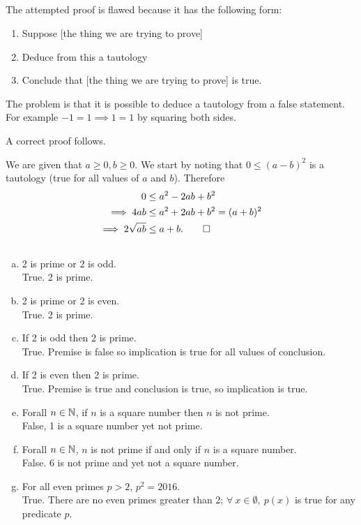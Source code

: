\documentclass[12pt]{article}
\begin{document}
\subsection{}
\begin{mdframed}
  The attempted proof is flawed because it has the following form:
  \begin{enumerate}
  \item Suppose [the thing we are trying to prove]
  \item Deduce from this a tautology
  \item Conclude that [the thing we are trying to prove] is true.
  \end{enumerate}
  The problem is that it is possible to deduce a tautology from a false
  statement. For example $-1 = 1 \implies 1 = 1$ by squaring both sides.

  A correct proof follows.

  We are given that $a \geq 0, b \geq 0$. We start by noting that
  $0 \leq (a - b)^2$ is a tautology (true for all values of $a$ and
  $b$). Therefore
  \begin{align*}
              0 &\leq a^2 -2ab + b^2\\
    \implies  4ab &\leq a^2 + 2ab + b^2 = (a + b)^2\\
    \implies  2\sqrt{ab} &\leq a+b. \qed
  \end{align*}
\end{mdframed}

\subsection{}
\begin{mdframed}
  \begin{enumerate}[(a)]
  \item 2 is prime or 2 is odd.\\
    True. 2 is prime.
  \item 2 is prime or 2 is even.\\
    True. 2 is prime.
  \item If 2 is odd then 2 is prime.\\
    True. Premise is false so implication is true for all values of conclusion.
  \item If 2 is even then 2 is prime.\\
    True. Premise is true and conclusion is true, so implication is true.
  \item Forall $n \in \mathbb{N}$, if $n$ is a square number then $n$ is not prime.\\
    False, 1 is a square number yet not prime.
  \item Forall $n \in \mathbb{N}$, $n$ is not prime if and only if $n$ is a square number.\\
    False. 6 is not prime and yet not a square number.
  \item For all even primes $p > 2$, $p^2 = 2016$.\\
    True. There are no even primes greater than 2;
    $\forall ~ x \in \emptyset, ~p(x)$ is true for any predicate $p$.
  \end{enumerate}
\end{mdframed}
\end{document}

